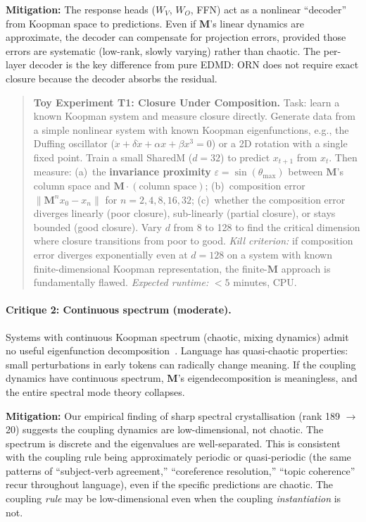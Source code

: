 \documentclass[11pt, a4paper]{article}
\newcommand{\M}{\mathbf{M}}
\theoremstyle{plain}
\theoremstyle{remark}
\begin{document}
\textbf{Mitigation:} The response heads ($W_V$, $W_O$, FFN) act as a nonlinear ``decoder'' from Koopman space to predictions.
Even if $\M$'s linear dynamics are approximate, the decoder can compensate for projection errors, provided those errors are systematic (low-rank, slowly varying) rather than chaotic.
The per-layer decoder is the key difference from pure EDMD: ORN does not require exact closure because the decoder absorbs the residual.

\begin{quote}\small
\textbf{Toy Experiment T1: Closure Under Composition.}
Task: learn a known Koopman system and measure closure directly.
Generate data from a simple nonlinear system with known Koopman eigenfunctions, e.g., the Duffing oscillator ($\ddot{x} + \delta\dot{x} + \alpha x + \beta x^3 = 0$) or a 2D rotation with a single fixed point.
Train a small SharedM ($d{=}32$) to predict $x_{t+1}$ from $x_t$.
Then measure:
(a)~the \textbf{invariance proximity} $\varepsilon = \sin(\theta_{\max})$ between $\M$'s column space and $\M \cdot (\text{column space})$;
(b)~composition error $\|\M^n x_0 - x_n\|$ for $n = 2, 4, 8, 16, 32$;
(c)~whether the composition error diverges linearly (poor closure), sub-linearly (partial closure), or stays bounded (good closure).
Vary $d$ from 8 to 128 to find the critical dimension where closure transitions from poor to good.
\emph{Kill criterion:} if composition error diverges exponentially even at $d{=}128$ on a system with known finite-dimensional Koopman representation, the finite-$\M$ approach is fundamentally flawed.
\emph{Expected runtime:} $<5$ minutes, CPU.
\end{quote}

\paragraph{Critique 2: Continuous spectrum (moderate).}
Systems with continuous Koopman spectrum (chaotic, mixing dynamics) admit no useful eigenfunction decomposition~\cite{brunton2022modern}.
Language has quasi-chaotic properties: small perturbations in early tokens can radically change meaning.
If the coupling dynamics have continuous spectrum, $\M$'s eigendecomposition is meaningless, and the entire spectral mode theory collapses.

\textbf{Mitigation:} Our empirical finding of sharp spectral crystallisation (rank 189 $\to$ 20) suggests the coupling dynamics are low-dimensional, not chaotic.
The spectrum is discrete and the eigenvalues are well-separated.
This is consistent with the coupling rule being approximately periodic or quasi-periodic (the same patterns of ``subject-verb agreement,'' ``coreference resolution,'' ``topic coherence'' recur throughout language), even if the specific predictions are chaotic.
The coupling \emph{rule} may be low-dimensional even when the coupling \emph{instantiation} is not.
\end{document}
